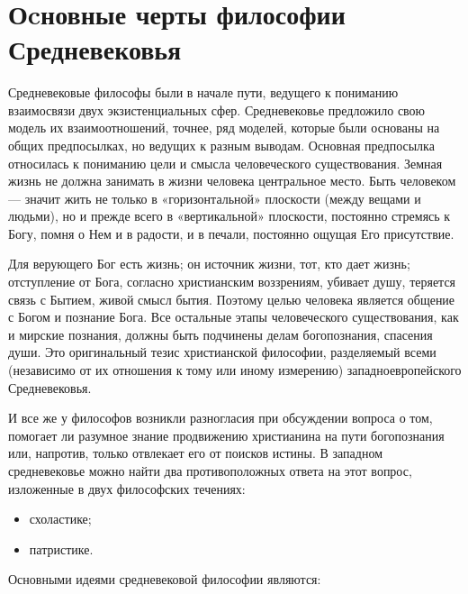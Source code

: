 \documentclass[14pt]{extarticle}
\begin{document}
\title{ \newline {}}
\maketitle

\section{Оcновные черты философии Средневековья}
Средневековые философы были в начале пути, ведущего к пониманию взаимосвязи двух экзистенциальных сфер. Средневековье предложило свою модель их взаимоотношений, точнее, ряд моделей, которые были основаны на общих предпосылках, но ведущих к разным выводам. Основная предпосылка относилась к пониманию цели и смысла человеческого существования. Земная жизнь не должна занимать в жизни человека центральное место. Быть человеком — значит жить не только в «горизонтальной» плоскости (между вещами и людьми), но и прежде всего в «вертикальной» плоскости, постоянно стремясь к Богу, помня о Нем и в радости, и в печали, постоянно ощущая Его присутствие. 

Для верующего Бог есть жизнь; он источник жизни, тот, кто дает жизнь; отступление от Бога, согласно христианским воззрениям, убивает душу, теряется связь с Бытием, живой смысл бытия. Поэтому целью человека является общение с Богом и познание Бога. Все остальные этапы человеческого существования, как и мирские познания, должны быть подчинены делам богопознания, спасения души. Это оригинальный тезис христианской философии, разделяемый всеми (независимо от их отношения к тому или иному измерению) западноевропейского Средневековья.

И все же у философов возникли разногласия при обсуждении вопроса о том, помогает ли разумное знание продвижению христианина на пути богопознания или, напротив, только отвлекает его от поисков истины. В западном средневековье можно найти два противоположных ответа на этот вопрос, изложенные в двух философских течениях:


\begin{itemize}
	\item схоластике;
	\item патристике.
\end{itemize}

Основными идеями средневековой философии являются:
\end{document}
